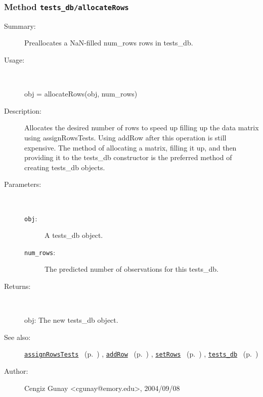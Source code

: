 \subsubsection[Method \texttt{allocateRows}]{Method \texttt{tests\_db/allocateRows}}%
%
\label{ref_tests_db__allocateRows}%
\hypertarget{ref_tests_db__allocateRows}{}%
\begin{description}
\item[Summary:]Preallocates a NaN-filled num\_rows rows in tests\_db.
%
\item[Usage:]~%
\begin{lyxcode}%
obj = allocateRows(obj, num\_rows)
%
\end{lyxcode}%
%
\item[Description:]%
Allocates the desired number of rows to speed up filling up the data matrix 
   using assignRowsTests. Using addRow after this operation is still expensive.
   The method of allocating a matrix, filling it up, and then providing it to 
   the tests\_db constructor is the preferred method of creating tests\_db objects.
\item[Parameters:]~
\begin{description}%
\item[\texttt{obj}:]
 A tests\_db object.
\item[\texttt{num\_rows}:]
 The predicted number of observations for this tests\_db.
\end{description}%
%
\item[Returns:]~

	obj: The new tests\_db object.
%
%
\item[See also:]%
\hyperlink{ref_assignRowsTests}{\texttt{assignRowsTests}}%
\ (p.~\pageref{ref_assignRowsTests})%
%
, \hyperlink{ref_addRow}{\texttt{addRow}}%
\ (p.~\pageref{ref_addRow})%
%
, \hyperlink{ref_setRows}{\texttt{setRows}}%
\ (p.~\pageref{ref_setRows})%
%
, \hyperlink{ref_tests_db}{\texttt{tests\_db}}%
\ (p.~\pageref{ref_tests_db})%
%
%
\item[Author:]%
Cengiz Gunay <cgunay@emory.edu>, 2004/09/08%
\end{description}
\methodline%

